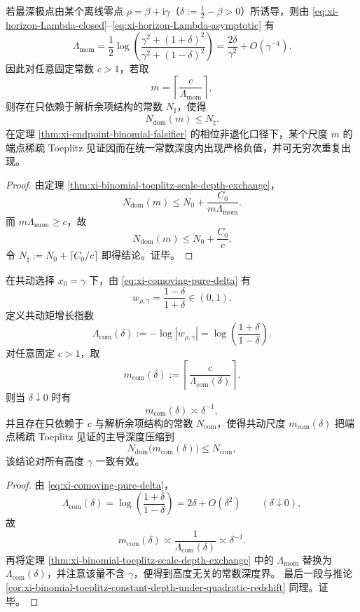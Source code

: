 \begin{corollary}[二次红移压缩下的常数深度检出]\label{cor:xi-binomial-toeplitz-constant-depth-under-quadratic-redshift}
若最深极点由某个离线零点 \(\rho=\beta+\mathrm{i}\gamma\)（\(\delta:=\tfrac12-\beta>0\)）所诱导，则由 \eqref{eq:xi-horizon-Lambda-closed}--\eqref{eq:xi-horizon-Lambda-asymptotic} 有
\[
\Lambda_{\mathrm{mom}}
=
\frac12\log\!\left(\frac{\gamma^2+(1+\delta)^2}{\gamma^2+(1-\delta)^2}\right)
=
\frac{2\delta}{\gamma^2}+O(\gamma^{-4}).
\]
因此对任意固定常数 \(c>1\)，若取
\[
m=\left\lceil \frac{c}{\Lambda_{\mathrm{mom}}}\right\rceil,
\]
则存在只依赖于解析余项结构的常数 \(N_\sharp\)，使得
\[
N_{\mathrm{dom}}(m)\le N_\sharp.
\]
在定理 \ref{thm:xi-endpoint-binomial-falsifier} 的相位非退化口径下，某个尺度 \(m\) 的端点稀疏 Toeplitz 见证因而在统一常数深度内出现严格负值，并可无穷次重复出现。
\end{corollary}

\begin{proof}
由定理 \ref{thm:xi-binomial-toeplitz-scale-depth-exchange}，
\[
N_{\mathrm{dom}}(m)
\le
N_0+\frac{C_0}{m\Lambda_{\mathrm{mom}}}.
\]
而 \(m\Lambda_{\mathrm{mom}}\ge c\)，故
\[
N_{\mathrm{dom}}(m)\le N_0+\frac{C_0}{c}.
\]
令 \(N_\sharp:=N_0+\lceil C_0/c\rceil\) 即得结论。证毕。
\end{proof}

\begin{theorem}[共动图表中的高度解耦尺度律]\label{thm:xi-binomial-toeplitz-comoving-delta-scale-law}
在共动选择 \(x_0=\gamma\) 下，由 \eqref{eq:xi-comoving-pure-delta} 有
\[
w_{\rho,\gamma}=\frac{1-\delta}{1+\delta}\in(0,1).
\]
定义共动矩增长指数
\[
\Lambda_{\mathrm{com}}(\delta)
:=
-\log|w_{\rho,\gamma}|
=
\log\!\left(\frac{1+\delta}{1-\delta}\right).
\]
对任意固定 \(c>1\)，取
\[
m_{\mathrm{com}}(\delta):=
\left\lceil \frac{c}{\Lambda_{\mathrm{com}}(\delta)}\right\rceil.
\]
则当 \(\delta\downarrow 0\) 时有
\[
\boxed{\;
m_{\mathrm{com}}(\delta)\asymp \delta^{-1},
\;}
\]
并且存在只依赖于 \(c\) 与解析余项结构的常数 \(N_{\mathrm{com}}\)，使得共动尺度 \(m_{\mathrm{com}}(\delta)\) 把端点稀疏 Toeplitz 见证的主导深度压缩到
\[
N_{\mathrm{dom}}\!\bigl(m_{\mathrm{com}}(\delta)\bigr)\le N_{\mathrm{com}},
\]
该结论对所有高度 \(\gamma\) 一致有效。
\end{theorem}

\begin{proof}
由 \eqref{eq:xi-comoving-pure-delta}，
\[
\Lambda_{\mathrm{com}}(\delta)
=
\log\!\left(\frac{1+\delta}{1-\delta}\right)
=
2\delta+O(\delta^2)
\qquad(\delta\downarrow 0),
\]
故
\[
m_{\mathrm{com}}(\delta)
\asymp \frac{1}{\Lambda_{\mathrm{com}}(\delta)}
\asymp \delta^{-1}.
\]
再将定理 \ref{thm:xi-binomial-toeplitz-scale-depth-exchange} 中的
\(\Lambda_{\mathrm{mom}}\) 替换为 \(\Lambda_{\mathrm{com}}(\delta)\)，并注意该量不含 \(\gamma\)，便得到高度无关的常数深度界。
最后一段与推论 \ref{cor:xi-binomial-toeplitz-constant-depth-under-quadratic-redshift} 同理。证毕。
\end{proof}

\endinput
